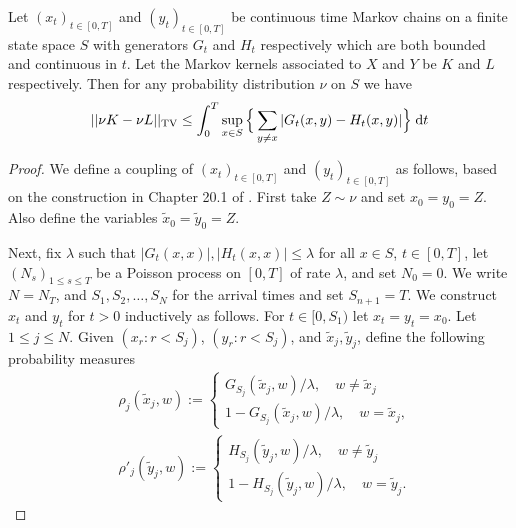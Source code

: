 \documentclass{article}
\begin{document}
\begin{proposition}
\label{prop:single_step_tv}
Let $(x_t)_{t \in [0,T]}$ and $(y_t)_{t \in [0,T]}$ be continuous time Markov chains on a finite state space $S$ with generators $G_t$ and $H_t$ respectively which are both bounded and continuous in $t$. Let the Markov kernels associated to $X$ and
$Y$ be $K$ and $L$ respectively. Then for any probability distribution $\nu$ on $S$ we have
\begin{equation}
    ||\nu K - \nu L||_{\textup{TV}} \leq \int_0^T \sup_{x \in S} \Big\{ \sum_{y \neq x} |G_t(x,y) - H_t(x,y)| \Big\} \; \mathrm{d}t
\end{equation}
\end{proposition}
\vspace{-1.0cm}
\begin{proof}
We define a coupling of $(x_t)_{t \in [0,T]}$ and $(y_t)_{t \in [0,T]}$ as follows, based on the construction in Chapter 20.1 of \cite{levin2009markovchains}. First take $Z \sim \nu$ and set $x_0 = y_0 = Z$. Also define the variables $\tilde{x}_0=\tilde{y}_0 = Z$.

Next, fix $\lambda$ such that $|G_t(x,x)|, |H_t(x,x)| \leq \lambda$ for all $x \in S$, $t \in [0,T]$, let $(N_s)_{1 \leq s \leq T}$ be a Poisson process on $[0, T]$ of rate $\lambda$, and set $N_0 = 0$. We write $N=N_T$, and 
 $S_1, S_2, \dots, S_{N}$ for the arrival times and set $S_{n+1}=T$. 
We construct $x_t$ and $y_t$ for $t > 0$ inductively as follows.
For $t\in [0, S_1)$ let $x_t=y_t=x_0$. 
Let $1\leq j\leq N$. Given $(x_{r}:r< S_j)$, $(y_r: r< S_j)$, and $\tilde{x}_j, \tilde{y}_j$, 
define the following probability measures 
\begin{align}
    &\rho_j(\tilde{x}_j, w):= \begin{cases}
                  \displaystyle G_{S_j}(\tilde{x}_j, w) / \lambda, \quad w\neq \tilde{x}_j\\
                  \displaystyle   1-G_{S_j}(\tilde{x}_j, w)/ \lambda, \quad w=\tilde{x}_j,
                    \end{cases}\\
    &\rho'_j(\tilde{y}_j, w):= \begin{cases}
                 \displaystyle    H_{S_j}(\tilde{y}_j, w) / \lambda, \quad w\neq \tilde{y}_j\\
               \displaystyle      1-H_{S_j}(\tilde{y}_j, w)/ \lambda, \quad w=\tilde{y}_j.
                    \end{cases}
\end{align}


\end{proof}
\end{document}
